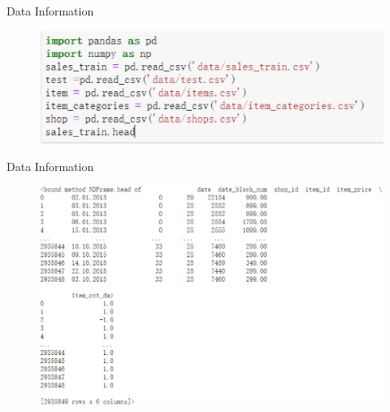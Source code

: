 \documentclass[
 size=14pt,
 paper=smartboard,  %
 mode=present, 		%
 display=slides, 	%
 style=tuliplab,  	%
 pauseslide,
 fleqn,leqno]{powerdot}
\begin{document}
\begin{slide}[toc=,bm=]{Data Information}
  \begin{figure}
    \includegraphics{picture/data_1.eps}
  \end{figure}
\end{slide}


\begin{slide}[toc=,bm=]{Data Information}
  \begin{figure}
    \includegraphics[scale=0.5]{picture/data_2.eps}
  \end{figure}
\end{slide}
\end{document}
